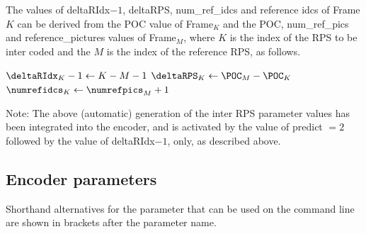 \documentclass[a4paper,11pt]{jctvcdoc}
\begin{document}
The values of deltaRIdx$-1$, deltaRPS, num_ref_idcs and reference
idcs of Frame$K$ can be derived from the POC value of Frame$_K$ and
the POC, num_ref_pics and reference_pictures values of Frame$_M$, where
$K$ is the index of the RPS to be inter coded and the $M$ is the
index of the reference RPS, as follows.

\setlength{\algomargin}{2em}
\begin{algorithm}[h]

$\deltaRIdx_K - 1  \leftarrow  K - M - 1$ \;
$\deltaRPS_K       \leftarrow  \POC_M - \POC_K$ \;
$\numrefidcs_K     \leftarrow  \numrefpics_M + 1$ \;


\end{algorithm}

Note: The above (automatic) generation of the inter RPS parameter
values has been integrated into the encoder, and is activated by
the value of predict $= 2$ followed by the value of deltaRIdx$-1$,
only, as described above.



\subsection{Encoder parameters}

Shorthand alternatives for the parameter that can be used on the command line are shown in brackets after the parameter name.
\end{document}
